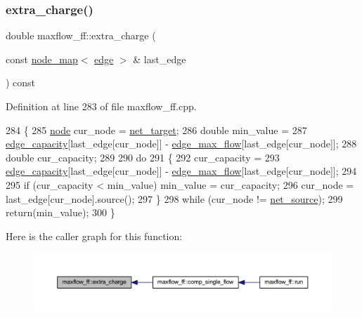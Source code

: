 \subsubsection{\texorpdfstring{extra\+\_\+charge()}{extra\_charge()}}
{\footnotesize\ttfamily double maxflow\+\_\+ff\+::extra\+\_\+charge (\begin{DoxyParamCaption}\item[{const \mbox{\hyperlink{classnode__map}{node\+\_\+map}}$<$ \mbox{\hyperlink{classedge}{edge}} $>$ \&}]{last\+\_\+edge }\end{DoxyParamCaption}) const\hspace{0.3cm}{\ttfamily [protected]}}



Definition at line 283 of file maxflow\+\_\+ff.\+cpp.


\begin{DoxyCode}
284 \{
285     \mbox{\hyperlink{classnode}{node}} cur\_node = \mbox{\hyperlink{classmaxflow__ff_a94d5db73364cf5824ec3d3d530b57319}{net\_target}};
286     \textcolor{keywordtype}{double} min\_value = 
287     \mbox{\hyperlink{classmaxflow__ff_a5b38943e093c77a57eb70f1a4190b8a6}{edge\_capacity}}[last\_edge[cur\_node]] - \mbox{\hyperlink{classmaxflow__ff_a669f36f1fae2dd0f6cfc0172e3ae0e8f}{edge\_max\_flow}}[last\_edge[cur\_node]];
288     \textcolor{keywordtype}{double} cur\_capacity;
289 
290     \textcolor{keywordflow}{do}
291     \{
292     cur\_capacity = 
293         \mbox{\hyperlink{classmaxflow__ff_a5b38943e093c77a57eb70f1a4190b8a6}{edge\_capacity}}[last\_edge[cur\_node]] - \mbox{\hyperlink{classmaxflow__ff_a669f36f1fae2dd0f6cfc0172e3ae0e8f}{edge\_max\_flow}}[last\_edge[cur\_node]];
294 
295     \textcolor{keywordflow}{if} (cur\_capacity < min\_value) min\_value = cur\_capacity;
296     cur\_node = last\_edge[cur\_node].source();
297     \}
298     \textcolor{keywordflow}{while} (cur\_node != \mbox{\hyperlink{classmaxflow__ff_a2e4cc02ce8c9d929f2896525c686d6c1}{net\_source}});
299     \textcolor{keywordflow}{return}(min\_value);
300 \}
\end{DoxyCode}
Here is the caller graph for this function\+:\nopagebreak
\begin{figure}[H]
\begin{center}
\leavevmode
\includegraphics[width=350pt]{classmaxflow__ff_a410a7c5b9b75225ec0a48402dc2f6555_icgraph}
\end{center}
\end{figure}
\mbox{\label{classmaxflow__ff_a4c120a7ea9be23d908036ebd2fb9298c}} 
